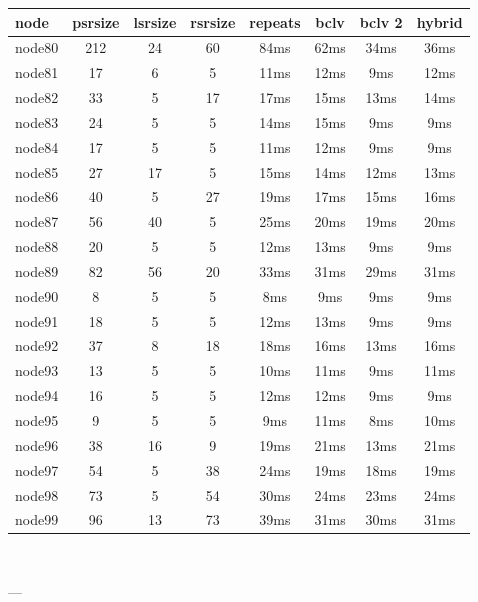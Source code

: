 \begin{tabular}{|l|c|c|c|c|c|c|c|}
\hline node & psrsize & lsrsize & rsrsize   & repeats & bclv & bclv 2 & hybrid\\
    \hline node80 & 212 & 24 & 60 & 84ms & 62ms & 34ms & 36ms\\
    \hline node81 & 17 & 6 & 5 & 11ms & 12ms & 9ms & 12ms\\
    \hline node82 & 33 & 5 & 17 & 17ms & 15ms & 13ms & 14ms\\
    \hline node83 & 24 & 5 & 5 & 14ms & 15ms & 9ms & 9ms\\
    \hline node84 & 17 & 5 & 5 & 11ms & 12ms & 9ms & 9ms\\
    \hline node85 & 27 & 17 & 5 & 15ms & 14ms & 12ms & 13ms\\
    \hline node86 & 40 & 5 & 27 & 19ms & 17ms & 15ms & 16ms\\
    \hline node87 & 56 & 40 & 5 & 25ms & 20ms & 19ms & 20ms\\
    \hline node88 & 20 & 5 & 5 & 12ms & 13ms & 9ms & 9ms\\
    \hline node89 & 82 & 56 & 20 & 33ms & 31ms & 29ms & 31ms\\
    \hline node90 & 8 & 5 & 5 & 8ms & 9ms & 9ms & 9ms\\
    \hline node91 & 18 & 5 & 5 & 12ms & 13ms & 9ms & 9ms\\
    \hline node92 & 37 & 8 & 18 & 18ms & 16ms & 13ms & 16ms\\
    \hline node93 & 13 & 5 & 5 & 10ms & 11ms & 9ms & 11ms\\
    \hline node94 & 16 & 5 & 5 & 12ms & 12ms & 9ms & 9ms\\
    \hline node95 & 9 & 5 & 5 & 9ms & 11ms & 8ms & 10ms\\
    \hline node96 & 38 & 16 & 9 & 19ms & 21ms & 13ms & 21ms\\
    \hline node97 & 54 & 5 & 38 & 24ms & 19ms & 18ms & 19ms\\
    \hline node98 & 73 & 5 & 54 & 30ms & 24ms & 23ms & 24ms\\
    \hline node99 & 96 & 13 & 73 & 39ms & 31ms & 30ms & 31ms\\

\hline
\end{tabular} \

---


